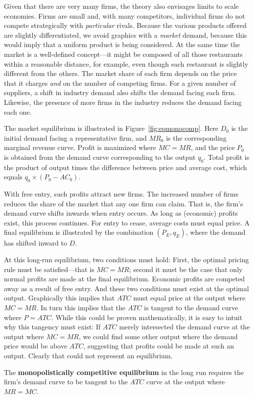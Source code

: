 Given that there are very many firms, the theory also envisages limits to scale economies. Firms are small and, with many competitors, individual firms do not compete strategically with \textit{particular} rivals. Because the various products offered are slightly differentiated, we avoid graphics with a \textit{market} demand, because this would imply that a uniform product is being considered. At the same time the market is a well-defined concept---it might be composed of all those restaurants within a reasonable distance, for example, even though each restaurant is slightly different from the others. The market share of each firm depends on the price that it charges \textit{and} on the number of competing firms. For a given number of suppliers, a shift in industry demand also shifts the demand facing each firm. Likewise, the presence of more firms in the industry reduces the demand facing each one.

The market equilibrium is illustrated in Figure~\ref{fig:eqmonocomp}. Here $D_0$ is the initial demand facing a representative firm, and $MR_0$ is the corresponding marginal revenue curve. Profit is maximized where $MC=MR$, and the price $P_0$ is obtained from the demand curve corresponding to the output $q_0$. Total profit is the product of output times the difference between price and average cost, which equals $q_0\times(P_0-AC_0)$.



With free entry, such profits attract new firms. The increased number of firms reduces the share of the market that any one firm can claim. That is, the firm's demand curve shifts inwards when entry occurs. As long as (economic) profits exist, this process continues. For entry to cease, average costs must equal price. A final equilibrium is illustrated by the combination $(P_E,q_E)$, where the demand has shifted inward to $D$.

At this long-run equilibrium, two conditions must hold: First, the optimal pricing rule must be satisfied---that is $MC=MR$; second it must be the case that only normal profits are made at the final equilibrium. Economic profits are competed away as a result of free entry. And these two conditions must exist at the optimal output. Graphically this implies that $ATC$ must equal price at the output where $MC=MR$. In turn this implies that the $ATC$ is tangent to the demand curve where $P=ATC$. While this could be proven mathematically, it is easy to intuit why this tangency must exist: If $ATC$ merely intersected the demand curve at the output where $MC=MR$, we could find some other output where the demand price would be above $ATC$, suggesting that profits could be made at such an output. Clearly that could not represent an equilibrium. 

\begin{DefBox}
The \textbf{monopolistically competitive equilibrium} in the long run requires the firm's demand curve to be tangent to the $ATC$ curve at the output where $MR=MC$.
\end{DefBox}